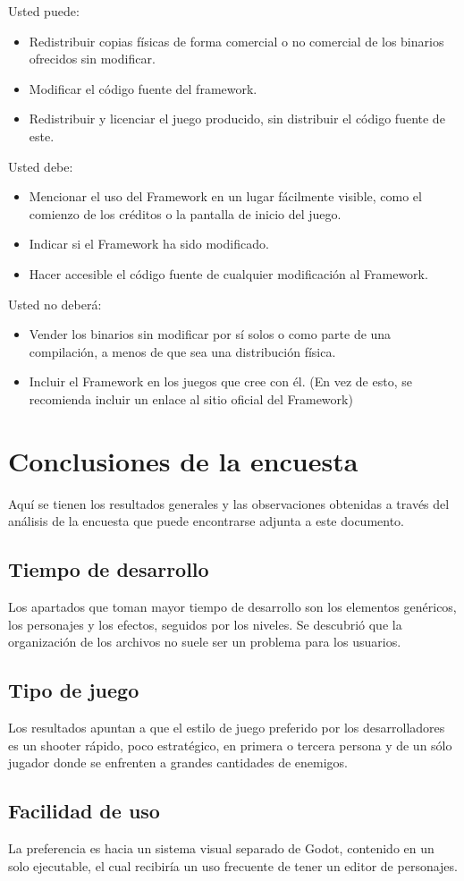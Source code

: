 \documentclass[]{article}
\begin{document}
Usted puede:
\begin{itemize}
	\item Redistribuir copias f\'isicas de forma comercial o no comercial de los binarios ofrecidos sin modificar. 
	\item Modificar el c\'odigo fuente del framework.
	\item Redistribuir y licenciar el juego producido, sin distribuir el c\'odigo fuente de este. 
\end{itemize}

Usted debe:
\begin{itemize}
	\item Mencionar el uso del Framework en un lugar f\'acilmente visible, como el comienzo de los cr\'editos o la pantalla de inicio del juego. 
	\item Indicar si el Framework ha sido modificado.
	\item Hacer accesible el c\'odigo fuente de cualquier modificaci\'on al Framework. 
\end{itemize}

Usted no deber\'a:
\begin{itemize}
	\item Vender los binarios sin modificar por s\'i solos o como parte de una compilaci\'on, a menos de que sea una distribuci\'on f\'isica.  
	\item Incluir el Framework en los juegos que cree con \'el. (En vez de esto, se recomienda incluir un enlace al sitio oficial del Framework)
\end{itemize}
\section{Conclusiones de la encuesta}
Aqu\'i se tienen los resultados generales y las observaciones obtenidas a trav\'es del an\'alisis de la encuesta que puede encontrarse adjunta a este documento. 
\subsection{Tiempo de desarrollo}
Los apartados que toman mayor tiempo de desarrollo son los elementos gen\'ericos, los personajes y los efectos, seguidos por los niveles. Se descubri\'o que la organizaci\'on de los archivos no suele ser un problema para los usuarios. 
\subsection{Tipo de juego}
Los resultados apuntan a que el estilo de juego preferido por los desarrolladores es un shooter r\'apido, poco estrat\'egico, en primera o tercera persona y de un s\'olo jugador donde se enfrenten a grandes cantidades de enemigos. 
\subsection{Facilidad de uso}
La preferencia es hacia un sistema visual separado de Godot, contenido en un solo ejecutable, el cual recibir\'ia un uso frecuente de tener un editor de personajes. 

\newpage


\end{document}
